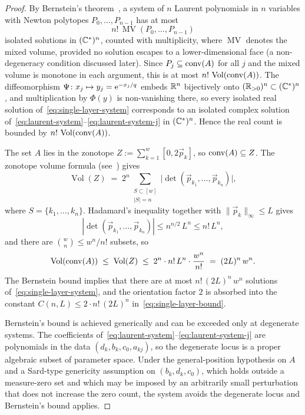 \begin{proof}
By Bernstein's theorem~\cite{bernstein1975}, a system of $n$ Laurent polynomials in $n$ variables with Newton polytopes $P_0,\ldots,P_{n-1}$ has at most
\begin{equation*}
  n!\,\operatorname{MV}(P_0,\ldots,P_{n-1})
\end{equation*}
isolated solutions in $(\mathbb{C}^*)^n$, counted with multiplicity, where $\operatorname{MV}$ denotes the mixed volume, provided no solution escapes to a lower-dimensional face (a non-degeneracy condition discussed later). Since $P_j\subseteq\operatorname{conv}(A)$ for all $j$ and the mixed volume is monotone in each argument, this is at most $n!\,\operatorname{Vol}(\operatorname{conv}(A))$. The diffeomorphism $\Psi\colon x_j\mapsto y_j=\mathrm{e}^{-x_j/q}$ embeds $\mathbb{R}^n$ bijectively onto $(\mathbb{R}_{>0})^n\subset(\mathbb{C}^*)^n$, and multiplication by $\Phi(y)$ is non-vanishing there, so every isolated real solution of~\eqref{eq:single-layer-system} corresponds to an isolated complex solution of~\eqref{eq:laurent-system}--\eqref{eq:laurent-system-j} in $(\mathbb{C}^*)^n$. Hence the real count is bounded by $n!\,\operatorname{Vol}(\operatorname{conv}(A))$.

The set $A$ lies in the zonotope $Z := \sum_{k=1}^w[0,2\vec p_k]$, so $\operatorname{conv}(A)\subseteq Z$. The zonotope volume formula (see~\cite[Ch.~7]{ziegler1995}) gives
\begin{equation}\label{eq:zonotope-volume}
  \operatorname{Vol}(Z) \;=\; 2^n \sum_{\substack{S\subset[w]\\ |S|=n}} \bigl|\det(\vec p_{k_1},\ldots,\vec p_{k_n})\bigr|,
\end{equation}
where $S=\{k_1,\ldots,k_n\}$. Hadamard's inequality together with $\|\vec p_k\|_\infty\leq L$ gives 
\begin{equation*}
|\det(\vec p_{k_1},\ldots,\vec p_{k_n})|\leq n^{n/2}\,L^n \leq n!\,L^n,
\end{equation*}
and there are $\binom{w}{n}\leq w^n/n!$ subsets, so
\begin{equation*}
  \operatorname{Vol}(\operatorname{conv}(A)) \;\leq\; \operatorname{Vol}(Z) \;\leq\; 2^n\cdot n!\,L^n\cdot\frac{w^n}{n!} \;=\; (2L)^n\,w^n.
\end{equation*}
The Bernstein bound implies that there are at most $n!\,(2L)^n\,w^n$ solutions of~\eqref{eq:single-layer-system}, and the orientation factor $2$ is absorbed into the constant $C(n,L)\leq 2\cdot n!\,(2L)^n$ in~\eqref{eq:single-layer-bound}.

Bernstein's bound is achieved generically and can be exceeded only at degenerate systems. The coefficients of~\eqref{eq:laurent-system}--\eqref{eq:laurent-system-j} are polynomials in the data $(d_k,b_k,c_0,a_{kj})$, so the degenerate locus is a proper algebraic subset of parameter space. Under the general-position hypothesis on $A$ and a Sard-type genericity assumption on $(b_k,d_k,c_0)$, which holds outside a measure-zero set and which may be imposed by an arbitrarily small perturbation that does not increase the zero count, the system avoids the degenerate locus and Bernstein's bound applies.
\end{proof}

